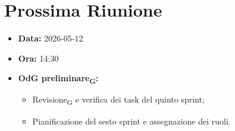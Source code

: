 \section{Prossima Riunione}
\begin{itemize}
	\item \textbf{Data:} 2026-05-12
	\item \textbf{Ora:} 14:30
	\item \textbf{OdG preliminare\textsubscript{G}:}
	\begin{itemize}
		\item Revisione\textsubscript{G} e verifica dei task del quinto sprint;
		\item Pianificazione del sesto sprint e assegnazione dei ruoli.
	\end{itemize}
\end{itemize}